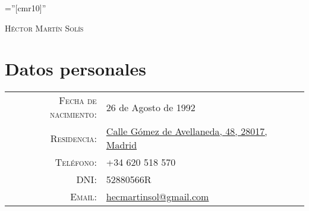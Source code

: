 \documentclass[a4paper,10pt]{article}
\begin{document}
\pagestyle{empty} %

\font\fb=''[cmr10]'' %

\par{\centering
		{\Huge \textsc{Héctor Martín Solís}
	}\bigskip\par}

\section{Datos personales}

\begin{tabular}{rl}
    \textsc{Fecha de nacimiento:} & 26 de Agosto de 1992 \\
    \textsc{Residencia:}   & \href{https://goo.gl/maps/D1nrAyg9Rat}{Calle Gómez de Avellaneda, 48, 28017, Madrid} \\
    \textsc{Teléfono:}     & +34 620 518 570\\
    \textsc{DNI:}     & 52880566R\\
    \textsc{Email:}     & \href{mailto:hecmartinsol@gmail.com}{hecmartinsol@gmail.com}
\end{tabular}

\end{document}

